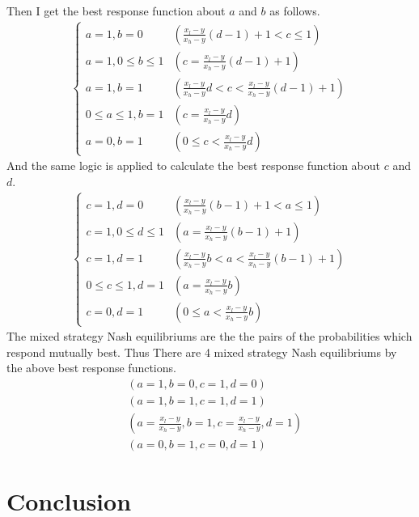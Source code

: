 \documentclass{article}
\begin{document}
	Then I get the best response function about $a$ and $b$ as follows.
	\begin{align*}
            	\begin{cases}
            	a = 1, b= 0 & \left( \frac{x_l - y}{x_h - y}(d-1) + 1 < c \leq 1 \right) \\[8pt]
            	a = 1, 0 \leq b \leq 1 & \left( c = \frac{x_l - y}{x_h - y}(d-1) + 1 \right) \\[8pt]
		a = 1, b = 1 & \left( \frac{x_l - y}{x_h - y}d < c < \frac{x_l - y}{x_h - y}(d-1) + 1 \right) \\[8pt]
		0 \leq a \leq 1, b = 1 & \left( c = \frac{x_l - y}{x_h - y}d \right) \\[8pt]
		a = 0, b = 1 & \left( 0 \leq c < \frac{x_l - y}{x_h - y}d \right)
            	\end{cases}
	\end{align*}
	And the same logic is applied to calculate the best response function about $c$ and $d$.
	\begin{align*}
            	\begin{cases}
            	c = 1, d= 0 & \left( \frac{x_l - y}{x_h - y}(b-1) + 1 < a \leq 1 \right) \\[8pt]
            	c = 1, 0 \leq d \leq 1 & \left( a = \frac{x_l - y}{x_h - y}(b-1) + 1 \right) \\[8pt]
		c = 1, d = 1 & \left( \frac{x_l - y}{x_h - y}b < a < \frac{x_l - y}{x_h - y}(b-1) + 1 \right) \\[8pt]
		0 \leq c \leq 1, d = 1 & \left( a = \frac{x_l - y}{x_h - y}b \right) \\[8pt]
		c = 0, d = 1 & \left( 0 \leq a < \frac{x_l - y}{x_h - y}b \right)
            	\end{cases}
	\end{align*}
	The mixed strategy Nash equilibriums are the the pairs of the probabilities which respond mutually best. Thus There are 4 mixed strategy Nash equilibriums by the above best response functions.
	\begin{align}
	&(a = 1, b = 0, c = 1, d = 0)\\
	&(a = 1, b = 1, c =1, d = 1)\\
	&\left(a = \frac{x_l - y}{x_h - y}, b = 1, c = \frac{x_l - y}{x_h - y}, d = 1 \right)\\
	&(a = 0, b = 1, c = 0, d = 1)
	\end{align}
	




\section{Conclusion}
\end{document}
